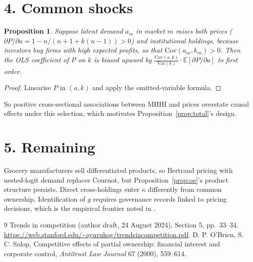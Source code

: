\documentclass[11pt]{article}
\newtheorem{proposition}[theorem]{Proposition}
\theoremstyle{definition}
\begin{document}
\section*{4. Common shocks}
\begin{proposition}\label{prop:bias}
Suppose latent demand $a_m$ in market $m$ raises both prices ($\partial P/\partial a=1-n/(n+1+k(n-1))>0$) and institutional
holdings, because investors buy firms with high expected profits, so that $\mathrm{Cov}(a_m,k_m)>0$. Then the OLS
coefficient of $P$ on $k$ is biased upward by
$\frac{\mathrm{Cov}(a,k)}{\mathrm{Var}(k)}\cdot\mathbb E[\partial P/\partial a]$ to first order.
\end{proposition}
\begin{proof}
Linearise $P$ in $(a,k)$ and apply the omitted-variable formula.
\end{proof}
So positive cross-sectional associations between MHHI and prices overstate causal effects under this selection, which
motivates Proposition~\ref{prop:total}'s design.

\section*{5. Remaining}
Grocery manufacturers sell differentiated products, so Bertrand pricing with nested-logit demand replaces Cournot, but
Proposition~\ref{prop:oe}'s product structure persists. Direct cross-holdings enter $\kappa$ differently from common
ownership. Identification of $g$ requires governance records linked to pricing decisions, which is the empirical frontier
noted in \cite{yur}.

\begin{thebibliography}{9}
 Trends in competition (author draft, 24 August 2024), Section 5, pp.~33--34. \url{https://web.stanford.edu/~ayurukog/trendsincompetition.pdf}.
 D. P. O'Brien, S. C. Salop, Competitive effects of partial ownership: financial interest and corporate control, \emph{Antitrust Law Journal} 67 (2000), 559--614.
\end{thebibliography}
\end{document}
